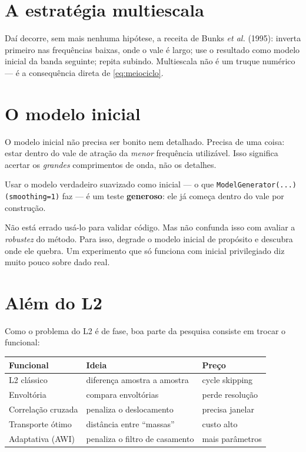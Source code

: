 \documentclass[11pt,a4paper,oneside]{report}
\begin{document}
\section{A estratégia multiescala}

Daí decorre, sem mais nenhuma hipótese, a receita de Bunks \emph{et al.}
(1995): inverta primeiro nas frequências baixas, onde o vale é largo; use o
resultado como modelo inicial da banda seguinte; repita subindo. Multiescala
não é um truque numérico --- é a consequência direta de \eqref{eq:meiociclo}.

\section{O modelo inicial}

O modelo inicial não precisa ser bonito nem detalhado. Precisa de uma coisa:
estar dentro do vale de atração da \emph{menor} frequência utilizável. Isso
significa acertar os \emph{grandes} comprimentos de onda, não os detalhes.

\begin{armadilha}
Usar o modelo verdadeiro suavizado como inicial --- o que
\texttt{ModelGenerator(...)(smoothing=1)} faz --- é um teste \textbf{generoso}:
ele já começa dentro do vale por construção.

Não está errado usá-lo para validar código. Mas não confunda isso com avaliar
a \emph{robustez} do método. Para isso, degrade o modelo inicial de propósito
e descubra onde ele quebra. Um experimento que só funciona com inicial
privilegiado diz muito pouco sobre dado real.
\end{armadilha}

\section{Além do L2}

Como o problema do L2 é de fase, boa parte da pesquisa consiste em trocar o
funcional:

\begin{center}
\begin{tabular}{@{}lll@{}}
\toprule
\textbf{Funcional} & \textbf{Ideia} & \textbf{Preço} \\
\midrule
L2 clássico & diferença amostra a amostra & cycle skipping \\
Envoltória & compara envoltórias & perde resolução \\
Correlação cruzada & penaliza o deslocamento & precisa janelar \\
Transporte ótimo & distância entre ``massas'' & custo alto \\
Adaptativa (AWI) & penaliza o filtro de casamento & mais parâmetros \\
\bottomrule
\end{tabular}
\end{center}
\end{document}
